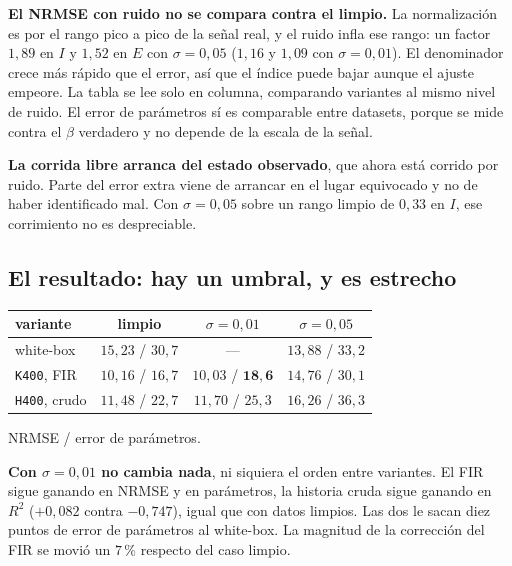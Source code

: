 \documentclass[11pt,a4paper]{article}
\begin{document}
\smallskip\par\textbf{El NRMSE con ruido no se compara contra el limpio.} La
normalización es por el rango pico a pico de la señal real, y el ruido infla ese
rango: un factor $1{,}89$ en $I$ y $1{,}52$ en $E$ con $\sigma = 0{,}05$
($1{,}16$ y $1{,}09$ con $\sigma = 0{,}01$). El denominador crece más rápido que
el error, así que el índice puede bajar aunque el ajuste empeore. La tabla se lee
solo en columna, comparando variantes al mismo nivel de ruido. El error de
parámetros sí es comparable entre datasets, porque se mide contra el $\beta$
verdadero y no depende de la escala de la señal.

\smallskip\par\textbf{La corrida libre arranca del estado observado}, que ahora
está corrido por ruido. Parte del error extra viene de arrancar en el lugar
equivocado y no de haber identificado mal. Con $\sigma = 0{,}05$ sobre un rango
limpio de $0{,}33$ en $I$, ese corrimiento no es despreciable.

\subsection{El resultado: hay un umbral, y es estrecho}

\begin{center}
\small
\begin{tabular}{lccc}
\toprule
\textbf{variante} & \textbf{limpio} & \textbf{$\sigma = 0{,}01$} &
\textbf{$\sigma = 0{,}05$} \\
\midrule
white-box              & $15{,}23$ / $30{,}7$ & ---                  & $13{,}88$ / $33{,}2$ \\
\texttt{K400}, FIR     & $10{,}16$ / $16{,}7$ & $10{,}03$ / $\mathbf{18{,}6}$ & $14{,}76$ / $30{,}1$ \\
\texttt{H400}, crudo   & $11{,}48$ / $22{,}7$ & $11{,}70$ / $25{,}3$ & $16{,}26$ / $36{,}3$ \\
\bottomrule
\end{tabular}
\end{center}

\noindent\small NRMSE / error de parámetros.\normalsize

\smallskip\par\textbf{Con $\sigma = 0{,}01$ no cambia nada}, ni siquiera el orden
entre variantes. El FIR sigue ganando en NRMSE y en parámetros, la historia cruda
sigue ganando en $R^2$ ($+0{,}082$ contra $-0{,}747$), igual que con datos
limpios. Las dos le sacan diez puntos de error de parámetros al white-box. La
magnitud de la corrección del FIR se movió un $7\,\%$ respecto del caso limpio.
\end{document}
